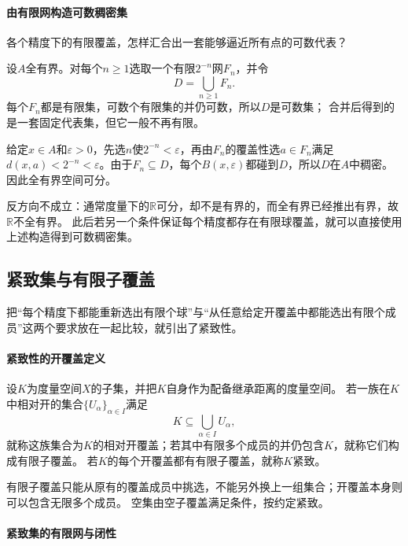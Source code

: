 \paragraph{由有限网构造可数稠密集}

各个精度下的有限覆盖，怎样汇合出一套能够逼近所有点的可数代表？

设$A$全有界。对每个$n\geq1$选取一个有限$2^{-n}$网$F_n$，并令
\[
  D=\bigcup_{n\geq1}F_n.
\]
每个$F_n$都是有限集，可数个有限集的并仍可数，所以$D$是可数集；
合并后得到的是一套固定代表集，但它一般不再有限。

给定$x\in A$和$\varepsilon>0$，先选$n$使$2^{-n}<\varepsilon$，再由$F_n$的覆盖性选$a\in F_n$满足
$d(x,a)<2^{-n}<\varepsilon$。由于$F_n\subseteq D$，每个$B(x,\varepsilon)$都碰到$D$，所以$D$在$A$中稠密。
因此全有界空间可分。

反方向不成立：通常度量下的$\mathbb R$可分，却不是有界的，而全有界已经推出有界，故$\mathbb R$不全有界。
此后若另一个条件保证每个精度都存在有限球覆盖，就可以直接使用上述构造得到可数稠密集。

\subsection{紧致集与有限子覆盖}
\label{sec:metric-compact-control}

把“每个精度下都能重新选出有限个球”与“从任意给定开覆盖中都能选出有限个成员”这两个要求放在一起比较，就引出了紧致性。

\paragraph{紧致性的开覆盖定义}

\begin{definition}
\label{def:metric-compactness}
设$K$为度量空间$X$的子集，并把$K$自身作为配备继承距离的度量空间。
若一族在$K$中相对开的集合$\{U_\alpha\}_{\alpha\in I}$满足
\[
  K\subseteq\bigcup_{\alpha\in I}U_\alpha,
\]
就称这族集合为$K$的相对开覆盖；若其中有限多个成员的并仍包含$K$，就称它们构成有限子覆盖。
若$K$的每个开覆盖都有有限子覆盖，就称$K$紧致。
\end{definition}

有限子覆盖只能从原有的覆盖成员中挑选，不能另外换上一组集合；开覆盖本身则可以包含无限多个成员。
空集由空子覆盖满足条件，按约定紧致。

\paragraph{紧致集的有限网与闭性}

